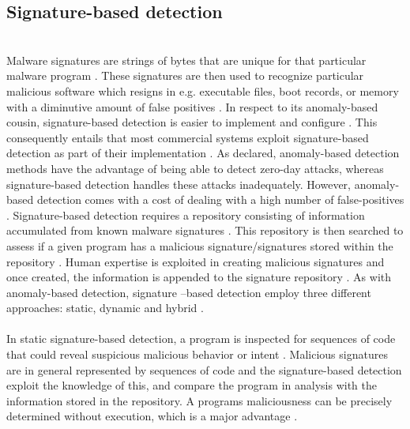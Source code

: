 \documentclass[12pt]{article} %
\begin{document}
\subsection{Signature-based detection}
\\
Malware signatures are strings of bytes that are unique for that particular malware program \cite{ye2007imds}. These signatures are then used to recognize particular malicious software which resigns in e.g. executable files, boot records, or memory with a diminutive amount of false positives \cite{ye2007imds}. In respect to its anomaly-based cousin, signature-based detection is easier to implement and configure \cite{kruegel2003using}. This consequently entails that most commercial systems exploit signature-based detection as part of their implementation \cite{kruegel2003using}. As declared, anomaly-based detection methods have the advantage of being able to detect zero-day attacks, whereas signature-based detection handles these attacks inadequately. However, anomaly-based detection comes with a cost of dealing with a high number of false-positives \cite{kruegel2003using}. Signature-based detection requires a repository consisting of information accumulated from known malware signatures \cite{kruegel2003using, idika2007survey}. This repository is then searched to assess if a given program has a malicious signature/signatures stored within the repository \cite{idika2007survey}. Human expertise is exploited in creating malicious signatures and once created, the information is appended to the signature repository \cite{idika2007survey}. As with anomaly-based detection, signature –based detection employ three different approaches: static, dynamic and hybrid \cite{idika2007survey}.
\\ \\
In static signature-based detection, a program is inspected for sequences of code that could reveal suspicious malicious behavior or intent \cite{idika2007survey}. Malicious signatures are in general represented by sequences of code and the signature-based detection exploit the knowledge of this, and compare the program in analysis with the information stored in the repository. A programs maliciousness can be precisely determined without execution, which is a major advantage \cite{idika2007survey}. \\
\end{document}
